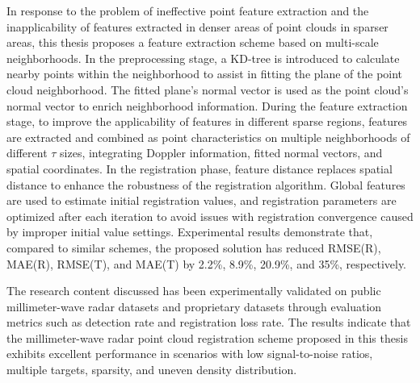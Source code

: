 In response to the problem of ineffective point feature extraction and the inapplicability of features extracted in denser areas of point clouds in sparser areas, this thesis proposes a feature extraction scheme based on multi-scale neighborhoods. In the preprocessing stage, a KD-tree is introduced to calculate nearby points within the neighborhood to assist in fitting the plane of the point cloud neighborhood. The fitted plane's normal vector is used as the point cloud's normal vector to enrich neighborhood information. During the feature extraction stage, to improve the applicability of features in different sparse regions, features are extracted and combined as point characteristics on multiple neighborhoods of different $\tau$ sizes, integrating Doppler information, fitted normal vectors, and spatial coordinates. In the registration phase, feature distance replaces spatial distance to enhance the robustness of the registration algorithm. Global features are used to estimate initial registration values, and registration parameters are optimized after each iteration to avoid issues with registration convergence caused by improper initial value settings. Experimental results demonstrate that, compared to similar schemes, the proposed solution has reduced RMSE(R), MAE(R), RMSE(T), and MAE(T) by 2.2\%, 8.9\%, 20.9\%, and 35\%, respectively.

The research content discussed has been experimentally validated on public millimeter-wave radar datasets and proprietary datasets through evaluation metrics such as detection rate and registration loss rate. The results indicate that the millimeter-wave radar point cloud registration scheme proposed in this thesis exhibits excellent performance in scenarios with low signal-to-noise ratios, multiple targets, sparsity, and uneven density distribution.